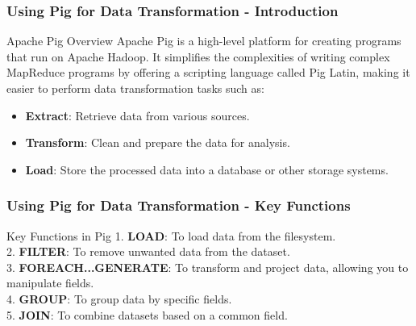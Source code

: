 \documentclass[aspectratio=169]{beamer}
\begin{document}
\begin{frame}[fragile]
    \frametitle{Using Pig for Data Transformation - Introduction}
    \begin{block}{Apache Pig Overview}
        Apache Pig is a high-level platform for creating programs that run on Apache Hadoop. It simplifies the complexities of writing complex MapReduce programs by offering a scripting language called Pig Latin, making it easier to perform data transformation tasks such as:
    \end{block}
    \begin{itemize}
        \item \textbf{Extract}: Retrieve data from various sources.
        \item \textbf{Transform}: Clean and prepare the data for analysis.
        \item \textbf{Load}: Store the processed data into a database or other storage systems.
    \end{itemize}
\end{frame}

\begin{frame}[fragile]
    \frametitle{Using Pig for Data Transformation - Key Functions}
    \begin{block}{Key Functions in Pig}
        1. \textbf{LOAD}: To load data from the filesystem. \\
        2. \textbf{FILTER}: To remove unwanted data from the dataset. \\
        3. \textbf{FOREACH...GENERATE}: To transform and project data, allowing you to manipulate fields. \\
        4. \textbf{GROUP}: To group data by specific fields. \\
        5. \textbf{JOIN}: To combine datasets based on a common field.
    \end{block}
\end{frame}
\end{document}
